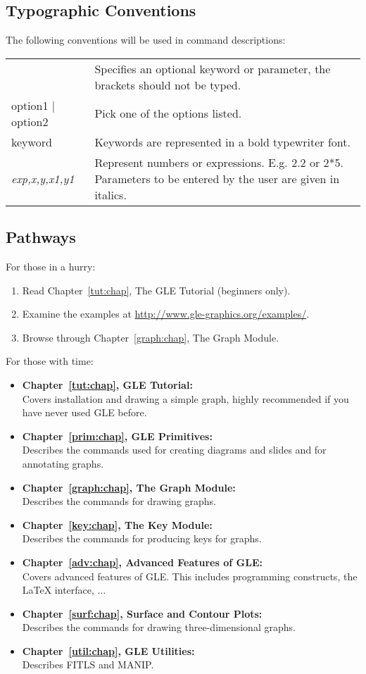\subsection*{Typographic Conventions} 

The following conventions will be used in command descriptions:

\begin{tabular}{lp{10cm}}
{\sf [option]} &  Specifies an optional keyword or parameter, the brackets
	should not be typed.\\
{\sf option1 $\mid$ option2} &
	Pick one of the options listed.\\
 {\sf keyword} &
	Keywords are represented in a bold typewriter font.\\
{\it exp,x,y,x1,y1} &
  	Represent numbers or expressions.  E.g. 2.2 or 2*5.
	Parameters to be entered by the user are given in italics.
\end{tabular}

\subsection*{Pathways}

For those in a hurry:
\begin{enumerate}
 \item		Read Chapter~\ref{tut:chap}, The GLE Tutorial (beginners only).
 \item		Examine the examples at \url{http://www.gle-graphics.org/examples/}.
 \item		Browse through Chapter~\ref{graph:chap}, The Graph Module.
\end{enumerate}
	
For those with time:
\begin{itemize}	
 \item {\bf Chapter~\ref{tut:chap}, GLE Tutorial:}\\
	Covers installation and drawing a simple graph, highly
	recommended if you have never used GLE before.
 \item {\bf Chapter~\ref{prim:chap}, GLE Primitives:}\\
	Describes the commands used for creating diagrams and slides and for annotating graphs.
 \item {\bf Chapter~\ref{graph:chap}, The Graph Module:}\\
	Describes the commands for drawing graphs.
 \item {\bf Chapter~\ref{key:chap}, The Key Module:}\\
	Describes the commands for producing keys for graphs.
 \item {\bf Chapter~\ref{adv:chap}, Advanced Features of GLE:}\\
	Covers advanced features of GLE. This includes programming constructs,
	the \LaTeX{} interface, $\ldots$
 \item {\bf Chapter~\ref{surf:chap}, Surface and Contour Plots:}\\
	Describes the commands for drawing three-dimensional graphs.
 \item {\bf Chapter~\ref{util:chap}, GLE Utilities:}\\
	Describes FITLS and MANIP.
\end{itemize}
